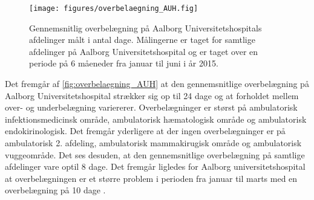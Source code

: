\begin{figure}[H]
\centering
\texttt{[image: figures/overbelaegning\_AUH.fig]}
\caption{Gennemsnitlig overbelægning på Aalborg Universitetshospitals afdelinger målt i antal dage. Målingerne er taget for samtlige afdelinger på Aalborg Universitetshospital og er taget over en periode på 6 måeneder fra januar til juni i år 2015.\citep{SDS2015}}
\label{fig:overbelaegning_AUH}
\end{figure}

\noindent
Det fremgår af \autoref{fig:overbelaegning_AUH} at den gennemsnitlige overbelægning på Aalborg Universitetshospital strækker sig op til 24 dage og at forholdet mellem over- og underbelægning variererer. Overbelægninger er størst på ambulatorisk infektionsmedicinsk område, ambulatorisk hæmatologisk område og ambulatorisk endokirinologisk. Det fremgår yderligere at der ingen overbelægninger er på ambulatorisk 2. afdeling, ambulatorisk mammakirugisk  område og ambulatorisk vuggeområde. Det ses desuden, at den gennemsnitlige overbelægning på samtlige afdelinger vare optil 8 dage. Det fremgår ligledes for Aalborg universitetshospital at overbelægningen er et større problem i perioden fra januar til marts med en overbelægning på 10 dage \citep{SDS2015}.    





